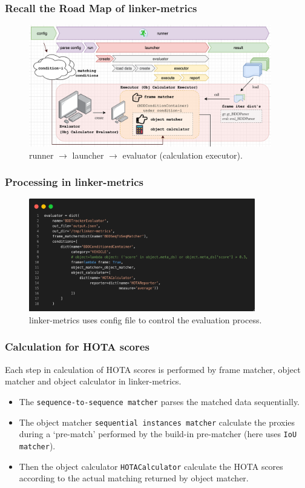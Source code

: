 \documentclass[slidetop, mathserif]{beamer}
\begin{document}
\begin{frame}
	\frametitle{Recall the Road Map of linker-metrics}

	\begin{figure}
		\includegraphics[width=300pt]{pics/fig12.png}
		\caption{runner $\to$ launcher $\to$ evaluator (calculation executor).}
	\end{figure}
\end{frame}

\begin{frame}
	\frametitle{Processing in linker-metrics}

	\begin{figure}
		\includegraphics[width=280pt]{pics/fig13.png}
		\caption{linker-metrics uses config file to control the evaluation process.}
	\end{figure}

\end{frame}

\begin{frame}
	\frametitle{Calculation for HOTA scores}

	Each step in calculation of HOTA scores is performed by frame matcher, object matcher
	and object calculator in linker-metrics.

	\begin{itemize}
	\item The {\tt sequence-to-sequence matcher} parses the matched data sequentially.

	\item The object matcher {\tt sequential instances matcher} calculate the proxies
		during a `pre-match' performed by the build-in pre-matcher (here uses {\tt IoU matcher}).

	\item Then the object calculator {\tt HOTACalculator} calculate the HOTA scores
		according to the actual matching returned by object matcher.
	\end{itemize}

\end{frame}

\begin{frame}
	\frametitle{}
\end{frame}
\end{document}
